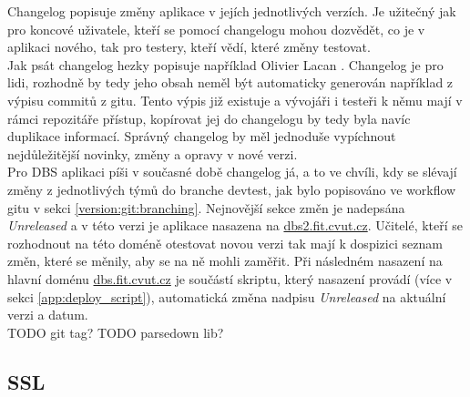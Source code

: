 Changelog popisuje změny aplikace v jejích jednotlivých verzích. Je užitečný jak pro koncové uživatele, kteří se pomocí changelogu mohou dozvědět, co je v aplikaci nového, tak pro testery, kteří vědí, které změny testovat.\\
Jak psát changelog hezky popisuje například Olivier Lacan \cite{changelog}. Changelog je pro lidi, rozhodně by tedy jeho obsah neměl být automaticky generován například z výpisu commitů z gitu. Tento výpis již existuje a vývojáři i testeři k němu mají v rámci repozitáře přístup, kopírovat jej do changelogu by tedy byla navíc duplikace informací. Správný changelog by měl jednoduše vypíchnout nejdůležitější novinky, změny a opravy v nové verzi.\\
Pro DBS aplikaci píši v současné době changelog já, a to ve chvíli, kdy se slévají změny z jednotlivých týmů do branche devtest, jak bylo popisováno ve workflow gitu v sekci \ref{version:git:branching}. Nejnovější sekce změn je nadepsána \emph{Unreleased} a v této verzi je aplikace nasazena na \url{dbs2.fit.cvut.cz}. Učitelé, kteří se rozhodnout na této doméně otestovat novou verzi tak mají k dospizici seznam změn, které se měnily, aby se na ně mohli zaměřit. Při následném nasazení na hlavní doménu \url{dbs.fit.cvut.cz} je součástí skriptu, který nasazení provádí (více v sekci \ref{app:deploy_script}), automatická změna nadpisu \emph{Unreleased} na aktuální verzi a datum.\\
TODO git tag? TODO parsedown lib?

\subsection{SSL}

